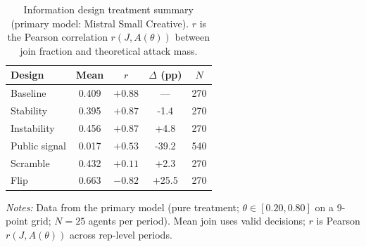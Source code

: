 \begin{table}[t]
\centering
\caption{Information design treatment summary (primary model: Mistral Small Creative). $r$ is the Pearson correlation $r(J, A(\theta))$ between join fraction and theoretical attack mass.}
\label{tab:infodesign_summary}
\small
\begin{tabular}{lcccc}
\toprule
Design & Mean & $r$ & $\Delta$ (pp) & $N$ \\
\midrule
Baseline & 0.409 & $+0.88$ & --- & 270 \\
Stability & 0.395 & $+0.87$ & -1.4 & 270 \\
Instability & 0.456 & $+0.87$ & +4.8 & 270 \\
Public signal & 0.017 & $+0.53$ & -39.2 & 540 \\
Scramble & 0.432 & $+0.11$ & +2.3 & 270 \\
Flip & 0.663 & $-0.82$ & +25.5 & 270 \\
\bottomrule
\end{tabular}
\vspace{0.25em}
\parbox{\columnwidth}{\footnotesize\emph{Notes:} Data from the primary model (pure treatment; $\theta \in [0.20, 0.80]$ on a 9-point grid; $N{=}25$ agents per period). Mean join uses valid decisions; $r$ is Pearson $r(J, A(\theta))$ across rep-level periods.}
\end{table}

